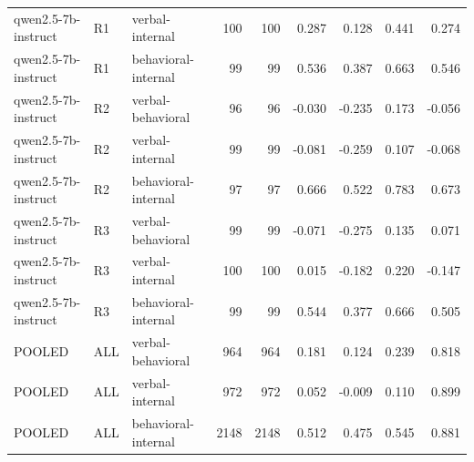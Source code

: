 \begin{table}
\begin{tabular}{lllrrrrrr}
qwen2.5-7b-instruct & R1 & verbal-internal & 100 & 100 & 0.287 & 0.128 & 0.441 & 0.274 \\
qwen2.5-7b-instruct & R1 & behavioral-internal & 99 & 99 & 0.536 & 0.387 & 0.663 & 0.546 \\
qwen2.5-7b-instruct & R2 & verbal-behavioral & 96 & 96 & -0.030 & -0.235 & 0.173 & -0.056 \\
qwen2.5-7b-instruct & R2 & verbal-internal & 99 & 99 & -0.081 & -0.259 & 0.107 & -0.068 \\
qwen2.5-7b-instruct & R2 & behavioral-internal & 97 & 97 & 0.666 & 0.522 & 0.783 & 0.673 \\
qwen2.5-7b-instruct & R3 & verbal-behavioral & 99 & 99 & -0.071 & -0.275 & 0.135 & 0.071 \\
qwen2.5-7b-instruct & R3 & verbal-internal & 100 & 100 & 0.015 & -0.182 & 0.220 & -0.147 \\
qwen2.5-7b-instruct & R3 & behavioral-internal & 99 & 99 & 0.544 & 0.377 & 0.666 & 0.505 \\
POOLED & ALL & verbal-behavioral & 964 & 964 & 0.181 & 0.124 & 0.239 & 0.818 \\
POOLED & ALL & verbal-internal & 972 & 972 & 0.052 & -0.009 & 0.110 & 0.899 \\
POOLED & ALL & behavioral-internal & 2148 & 2148 & 0.512 & 0.475 & 0.545 & 0.881 \\
\bottomrule
\end{tabular}
\end{table}
